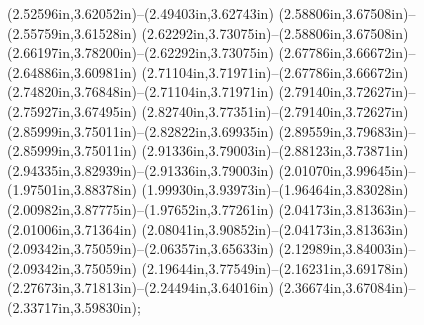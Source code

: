 (2.52596in,3.62052in)--(2.49403in,3.62743in) (2.58806in,3.67508in)--(2.55759in,3.61528in) (2.62292in,3.73075in)--(2.58806in,3.67508in) (2.66197in,3.78200in)--(2.62292in,3.73075in) (2.67786in,3.66672in)--(2.64886in,3.60981in) (2.71104in,3.71971in)--(2.67786in,3.66672in) (2.74820in,3.76848in)--(2.71104in,3.71971in) (2.79140in,3.72627in)--(2.75927in,3.67495in) (2.82740in,3.77351in)--(2.79140in,3.72627in) (2.85999in,3.75011in)--(2.82822in,3.69935in) (2.89559in,3.79683in)--(2.85999in,3.75011in) (2.91336in,3.79003in)--(2.88123in,3.73871in) (2.94335in,3.82939in)--(2.91336in,3.79003in) (2.01070in,3.99645in)--(1.97501in,3.88378in) (1.99930in,3.93973in)--(1.96464in,3.83028in) (2.00982in,3.87775in)--(1.97652in,3.77261in) (2.04173in,3.81363in)--(2.01006in,3.71364in) (2.08041in,3.90852in)--(2.04173in,3.81363in) (2.09342in,3.75059in)--(2.06357in,3.65633in) (2.12989in,3.84003in)--(2.09342in,3.75059in) (2.19644in,3.77549in)--(2.16231in,3.69178in) (2.27673in,3.71813in)--(2.24494in,3.64016in) (2.36674in,3.67084in)--(2.33717in,3.59830in);
